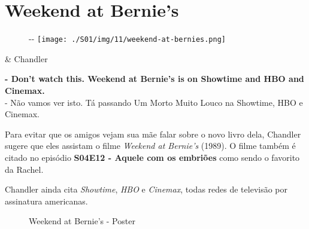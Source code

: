 \hypertarget{weekend-at-bernies}{%
\section{Weekend at Bernie's}\label{weekend-at-bernies}}

\begin{figure}[!ht]
  \begin{adjustwidth}{-\oddsidemargin-1in}{-\rightmargin}
    \centering
    \texttt{[image: ./S01/img/11/weekend-at-bernies.png]}
  \end{adjustwidth}
\end{figure}

\begin{tcolorbox}[enhanced,center upper,
    drop fuzzy shadow southeast, boxrule=0.3pt,
    lower separated=false, breakable,
    colframe=black!30!dialogoBorder,colback=white]
\begin{minipage}[c]{0.16\linewidth}
   & \centering \scriptsize{Chandler}
\end{minipage}
\hfill
\begin{minipage}[c]{0.8\linewidth}
  \textbf{- Don't watch this. Weekend at Bernie's is on Showtime and HBO and Cinemax.}\\
  - Não vamos ver isto. Tá passando Um Morto Muito Louco na Showtime, HBO e Cinemax.
\end{minipage}
\end{tcolorbox}

Para evitar que os amigos vejam sua mãe falar sobre o novo livro dela,
Chandler sugere que eles assistam o filme \emph{Weekend at Bernie's}
(1989). O filme também é citado no episódio
\textbf{\textcolor{primarycolor}{S04E12 - Aquele com os embriões}} como
sendo o favorito da Rachel.

Chandler ainda cita \emph{Showtime}, \emph{HBO} e \emph{Cinemax}, todas
redes de televisão por assinatura americanas.

\begin{figure}
  \centering
    \caption{Weekend at Bernie’s - Poster\label{fig:weekend-at-bernie-s-poster}}
\end{figure}

